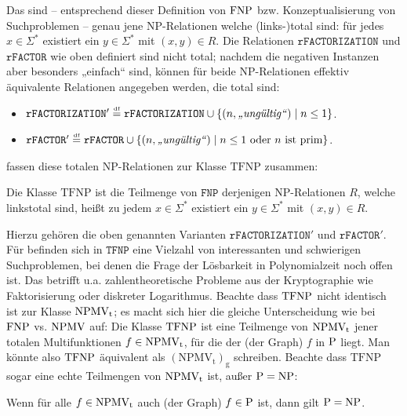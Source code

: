 Das sind -- entsprechend dieser Definition von $\FNP$ bzw. Konzeptualisierung von Suchproblemen -- genau jene NP-Relationen welche (links-)total sind: für jedes $x\in\Sigma^*$ existiert ein $y\in\Sigma^*$ mit $(x,y)\in R$. 
Die Relationen $\mathtt{rFACTORIZATION}$ und $\mathtt{rFACTOR}$ wie oben definiert sind nicht total; nachdem die negativen Instanzen aber besonders „einfach“ sind, können für beide NP-Relationen effektiv äquivalente Relationen angegeben werden, die total sind:
\begin{itemize} \item $\mathtt{rFACTORIZATION}' \defeq \mathtt{rFACTORIZATION} \cup \{ (n, \text{\emph{„ungültig“}}) \mid n\leq 1 \}$.
    \item $\mathtt{rFACTOR}' \defeq \mathtt{rFACTOR} \cup \{ (n, \text{\emph{„ungültig“}}) \mid n\leq 1 \text{ oder $n$ ist prim} \}$.
\end{itemize}
\textcite{megiddo_total_1991} fassen diese totalen NP-Relationen zur Klasse $\mathrm{TFNP}$ zusammen:
\begin{definition}
    Die Klasse $\mathrm{TFNP}$ ist die Teilmenge von $\mathtt{FNP}$ derjenigen NP-Relationen $R$, welche linkstotal sind, heißt zu jedem $x\in\Sigma^*$ existiert ein $y\in\Sigma^*$ mit $(x,y)\in R$.
\end{definition}
Hierzu gehören die oben genannten Varianten $\mathtt{rFACTORIZATION}'$ und $\mathtt{rFACTOR}'$.
Für \citeauthor{megiddo_total_1991} befinden sich in $\mathtt{TFNP}$ eine Vielzahl von interessanten und schwierigen Suchproblemen, bei denen die Frage der Lösbarkeit in Polynomialzeit noch offen ist.
Das betrifft u.a. zahlentheoretische Probleme aus der Kryptographie wie Faktorisierung oder diskreter Logarithmus. Beachte dass $\TFNP$ nicht identisch ist zur Klasse $\NPMVt$; es macht sich hier die gleiche Unterscheidung wie bei $\FNP$ vs. $\NPMV$ auf: Die Klasse $\TFNP$ ist eine Teilmenge von $\NPMVt$ jener totalen Multifunktionen $f\in\NPMVt$, für die der (der Graph) $f$ in $\P$ liegt. Man könnte also $\TFNP$ äquivalent als $\mathrm{(NPMV_{t})_{g}}$ schreiben.
Beachte dass $\mathrm{TFNP}$ sogar eine echte Teilmengen von $\NPMVt$ ist, außer $\P=\NP$:
\begin{observation}
    Wenn für alle $f\in\NPMVt$ auch (der Graph) $f\in \P$ ist, dann gilt $\P=\NP$.
\end{observation}
